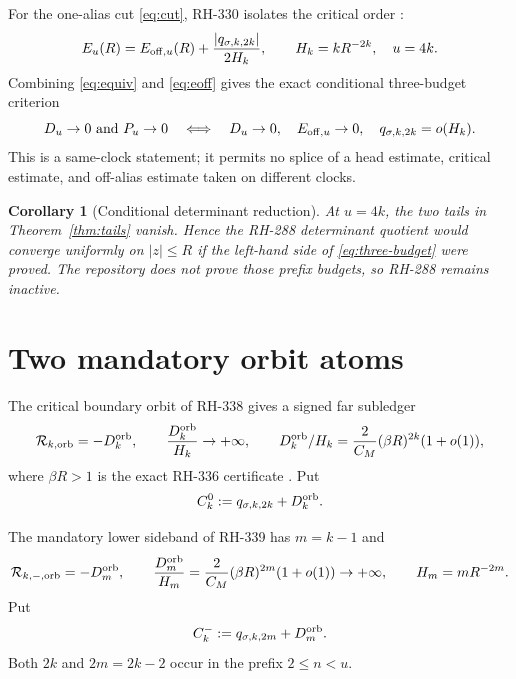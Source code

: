 \documentclass[11pt]{article}
\newtheorem{corollary}[theorem]{Corollary}
\theoremstyle{remark}
\newcommand{\cR}{\mathcal R}
\begin{document}
For the one-alias cut \eqref{eq:cut}, RH-330 isolates the critical order
\citep{WangTransfer2026}:
\begin{equation}\label{eq:eoff}
 E_u(R)=E_{{\rm off},u}(R)
 +\frac{|q_{\sigma,k,2k}|}{2H_k},
 \qquad H_k=kR^{-2k},
 \quad u=4k.
\end{equation}
Combining \eqref{eq:equiv} and \eqref{eq:eoff} gives the exact conditional
three-budget criterion
\begin{equation}\label{eq:three-budget}
 D_u\to0\ \text{and}\ P_u\to0
 \quad\Longleftrightarrow\quad
 D_u\to0,\quad E_{{\rm off},u}\to0,\quad
 q_{\sigma,k,2k}=o(H_k).
\end{equation}
This is a same-clock statement; it permits no splice of a head estimate,
critical estimate, and off-alias estimate taken on different clocks.

\begin{corollary}[Conditional determinant reduction]
\label{cor:det-reduction}
At $u=4k$, the two tails in Theorem~\ref{thm:tails} vanish.  Hence the
RH-288 determinant quotient would converge uniformly on $|z|\le R$ if the
left-hand side of \eqref{eq:three-budget} were proved.  The repository does
not prove those prefix budgets, so RH-288 remains inactive.
\end{corollary}

\section{Two mandatory orbit atoms}

The critical boundary orbit of RH-338 gives a signed far subledger
\citep{WangFarAtom2026}
\begin{equation}\label{eq:critical-scale}
 \cR_{k,\rm orb}=-D_k^{\rm orb},
 \qquad
 \frac{D_k^{\rm orb}}{H_k}\to+\infty,
 \qquad
 D_k^{\rm orb}/H_k
 =\frac2{C_M}(\beta R)^{2k}(1+o(1)),
\end{equation}
where $\beta R>1$ is the exact RH-336 certificate
\citep{WangFarAtom2026,WangProjectorMass2026}.  Put
\begin{equation}
 C_k^0:=q_{\sigma,k,2k}+D_k^{\rm orb}.
 \label{eq:C0}
\end{equation}

The mandatory lower sideband of RH-339 has $m=k-1$
\citep{WangSidebandAtom2026} and
\begin{equation}\label{eq:lower-atom}
 \cR_{k,-,\rm orb}=-D_m^{\rm orb},
 \qquad
 \frac{D_m^{\rm orb}}{H_m}
 =\frac2{C_M}(\beta R)^{2m}(1+o(1))\to+\infty,
 \qquad H_m=mR^{-2m}.
\end{equation}
Put
\begin{equation}
 C_k^-:=q_{\sigma,k,2m}+D_m^{\rm orb}.
 \label{eq:Cminus}
\end{equation}
Both $2k$ and $2m=2k-2$ occur in the prefix $2\le n<u$.
\end{document}
